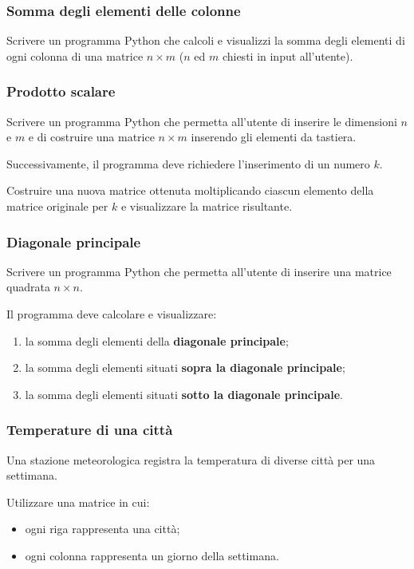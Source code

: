 \documentclass[a4paper,12pt]{article}
\begin{document}
	\subsubsection{Somma degli elementi delle colonne}
	Scrivere un programma Python che calcoli e visualizzi la somma degli elementi di ogni colonna di una matrice $n \times m$ ($n$ ed $m$ chiesti in input all'utente).
	
	\subsubsection{Prodotto scalare}
	Scrivere un programma Python che permetta all'utente di inserire le dimensioni $n$ e $m$ e di costruire una matrice $n \times m$ inserendo gli elementi da tastiera.
	
	Successivamente, il programma deve richiedere l'inserimento di un numero $k$.
	
	Costruire una nuova matrice ottenuta moltiplicando ciascun elemento della matrice originale per $k$ e visualizzare la matrice risultante.
		
	\subsubsection{Diagonale principale}
	
	Scrivere un programma Python che permetta all'utente di inserire una matrice quadrata
	$n \times n$.
	
	Il programma deve calcolare e visualizzare:
	
	\begin{enumerate}
		\item la somma degli elementi della \textbf{diagonale principale};
		\item la somma degli elementi situati \textbf{sopra la diagonale principale};
		\item la somma degli elementi situati \textbf{sotto la diagonale principale}.
	\end{enumerate}
	
	\subsubsection{Temperature di una città}
	Una stazione meteorologica registra la temperatura di diverse città per una settimana.
	
	Utilizzare una matrice in cui:
	\begin{itemize}
		\item ogni riga rappresenta una città;
		\item ogni colonna rappresenta un giorno della settimana.
	\end{itemize}
	
\end{document}
